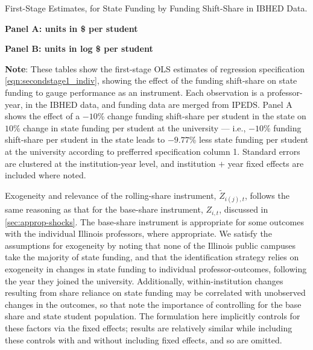 \begin{table}[h!]
    \singlespacing
    \centering
    \caption{First-Stage Estimates, for State Funding by Funding Shift-Share in IBHED Data.}
    \textbf{Panel A: units in \$ per student}
    
    \makebox[\textwidth][c]{}
    
    \textbf{Panel B: units in log \$ per student}
    
    \makebox[\textwidth][c]{}
    
    \label{tab:firststage-illinois}
    \justify
    \footnotesize
    \textbf{Note}:
    These tables show the first-stage OLS estimates of regression specification \eqref{eqn:secondstage1_indiv}, showing the effect of the funding shift-share on state funding to gauge performance as an instrument.
    Each observation is a professor-year, in the IBHED data, and funding data are merged from IPEDS.
    Panel A shows the effect of a $-10$\% change funding shift-share per student in the state on $10$\% change in state funding per student at the university --- i.e.,
    $-10$\% funding shift-share per student in the state leads to $-9.77$\% less state funding per student at the university according to prefferred specification column 1.        
    Standard errors are clustered at the institution-year level, and institution $+$ year fixed effects are included where noted.
\end{table}

Exogeneity and relevance of the rolling-share instrument, $\tilde Z_{i(j),t}$, follows the same reasoning as that for the base-share instrument, $Z_{i,t}$, discussed in \autoref{sec:approp-shocks}.
The base-share instrument is appropriate for some outcomes with the individual Illinois professors, where appropriate.
We satisfy the assumptions for exogeneity by noting that none of the Illinois public campuses take the majority of state funding, and that the identification strategy relies on exogeneity in changes in state funding to individual professor-outcomes, following the year they joined the university.
Additionally, within-institution changes resulting from share reliance on state funding may be correlated with unobserved changes in the outcomes, so that \cite{NBERw27885} note the importance of controlling for the base share and state student population.
The formulation here implicitly controls for these factors via the fixed effects; results are relatively similar while including these controls with and without including fixed effects, and so are omitted.

